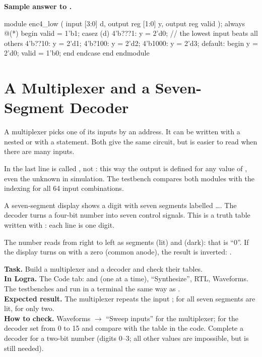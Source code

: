 \textbf{Sample answer to .}\par\nopagebreak
\begin{vcode}
module enc4_low (
    input      [3:0] d,
    output reg [1:0] y,
    output reg       valid
);
    always @(*) begin
        valid = 1'b1;
        casez (d)
            4'b???1: y = 2'd0;      // the lowest input beats all others
            4'b??10: y = 2'd1;
            4'b?100: y = 2'd2;
            4'b1000: y = 2'd3;
            default: begin y = 2'd0; valid = 1'b0; end
        endcase
    end
endmodule
\end{vcode}


\section{A Multiplexer and a Seven-Segment Decoder}
\label{sec:v-mux-seg}

A multiplexer picks one of its inputs by an address. It can be written with a
nested  or with a  statement. Both give the same circuit,
but  is easier to read when there are many inputs.


In  the last line is called , not :
this way the output is defined for any value of , even the unknown
 in simulation. The testbench  compares both modules
with the indexing  for all 64 input combinations.

A seven-segment display shows a digit with seven segments labelled
\ldots{}. The decoder turns a four-bit number into seven control
signals. This is a truth table written with : each line is one digit.


The number  reads from right to left as segments  (lit) and  (dark): that is ``0''. If the display turns on
with a zero (common anode), the result is inverted:
.

\begin{diybox}
\textbf{Task.} Build a multiplexer and a decoder and check their tables.\\
\textbf{In Logra.} The Code tab:  and  (one at a time),
``Synthesize'', RTL, Waveforms. The testbenches  and
 run in a terminal the same way as .\\
\textbf{Expected result.} The multiplexer repeats the input ; for
 all seven segments are lit, for  only two.\\
\textbf{How to check.} Waveforms $\to$ ``Sweep inputs'' for the multiplexer; for
the decoder set  from 0 to 15 and compare with the table in the code.
 Complete a decoder for a two-bit number (digits 0--3; all other
values are impossible, but  is still needed).
\end{diybox}

